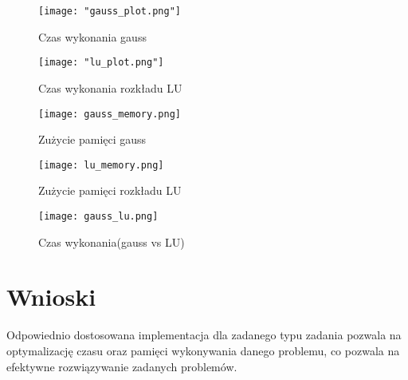 \documentclass{article}
\begin{document}
\begin{figure}[htpb] 
    \centering
    \texttt{[image: "gauss\_plot.png"]}
    \caption{Czas wykonania gauss}
    \label{eeexd}
\end{figure}

\begin{figure}[htpb]
    \centering
    \texttt{[image: "lu\_plot.png"]}
    \caption{Czas wykonania rozkładu LU}
    \label{lu_label}
\end{figure}

\begin{figure}[htpb] 
    \centering
    \texttt{[image: gauss\_memory.png]}
    \caption{Zużycie pamięci gauss}
    \label{xxx}
\end{figure}

\begin{figure}[htpb] 
    \centering
    \texttt{[image: lu\_memory.png]}
    \caption{Zużycie pamięci rozkładu LU}
    \label{lu_memory}
\end{figure}

\begin{figure}[htpb] 
    \centering
    \texttt{[image: gauss\_lu.png]}
    \caption{Czas wykonania(gauss vs LU)}
    \label{gauss_vs_lu}
\end{figure}

\section{Wnioski}
Odpowiednio dostosowana implementacja dla zadanego typu zadania pozwala na optymalizację czasu oraz pamięci wykonywania danego problemu, co pozwala na efektywne rozwiązywanie zadanych problemów.
\end{document}
